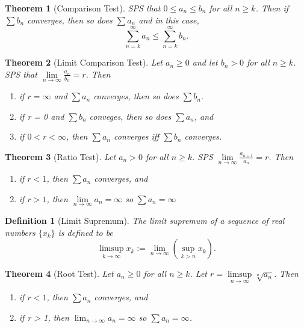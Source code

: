 \documentclass[11pt, oneside]{book}
\theoremstyle{break}
\newtheorem{thm}{Theorem}[section]
\newtheorem{defn}{Definition}[section]
\begin{document}
\begin{thm}[Comparison Test]
	SPS that $0 \leq a_n \leq b_n$ for all $n \geq k$. Then if $\sum b_n$ converges, then so does $\sum a_n$ and in this case,
	\[
		\sum_{n = k}^{\infty} a_n \leq \sum_{n = k}^{\infty} b_n.
	\]
\end{thm}

\begin{thm}[Limit Comparison Test]
	Let $a_n \geq 0$ and let $b_n > 0$ for all $n \geq k$. SPS that $\lim\limits_{n \to \infty} \frac{a_n}{b_n} = r$. Then
	\begin{enumerate}
		\item if $r = \infty$ and $\sum a_n$ converges, then so does $\sum b_n$.
		\item if r = 0 and $\sum b_n$ conveges, then so does $\sum a_n$, and
		\item if $0 < r < \infty$, then $\sum a_n$ converges iff $\sum b_n$ converges.
	\end{enumerate}
\end{thm}

\begin{thm}[Ratio Test]
	Let $a_n > 0$ for all $n \geq k$. SPS $\lim\limits_{n \to \infty} \frac{a_{n + 1}}{a_n} = r$. Then
	\begin{enumerate}
		\item if $r < 1$, then $\sum a_n$ converges, and
		\item if $r > 1$, then $\lim\limits_{n \to \infty} a_n = \infty$ so $\sum a_n = \infty$
	\end{enumerate}
\end{thm}

\begin{defn}[Limit Supremum]
	The limit supremum of a sequence of real numbers $\{x_k\}$ is defined to be
	\[
		\limsup_{k \to \infty} x_k := \lim_{n \to \infty} \left( \sup_{k > n} x_k \right).
	\]
\end{defn}

\begin{thm}[Root Test]
	Let $a_n \geq 0$ for all $n \geq k$. Let $r = \limsup\limits_{n \to \infty} \sqrt[n]{a_n}$. Then
	\begin{enumerate}
		\item if $r < 1$, then $\sum a_n$ converges, and
		\item if r > 1, then $\lim_{n \to \infty} a_n = \infty$ so $\sum a_n = \infty$.
	\end{enumerate}
\end{thm}
\end{document}
